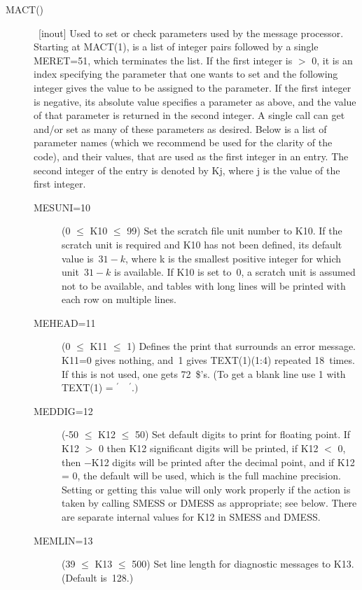 \documentclass[twoside]{MATH77}
\begin{document}
\begin{description}
\item[MACT()]  \ [inout] Used to set or check parameters used by the message
processor. Starting at MACT(1), is a list of integer pairs followed by a
single MERET=51, which terminates the list. If the first integer is $>$ 0,
it is an index specifying the parameter that one wants to set and the
following integer gives the value to be assigned to the parameter. If the
first integer is negative, its absolute value specifies a parameter as
above, and the value of that parameter is returned in the second integer. A
single call can get and/or set as many of these parameters as desired.
Below is a list of parameter names (which we recommend be used for the
clarity of the code), and their values, that are used as the first integer
in an entry. The second integer of the entry is denoted by Kj, where j is
the value of the first integer.

\begin{description}
\item[MESUNI=10]  (0 $\leq $ K10 $\leq $ 99) Set the scratch file unit
number to K10.  If the scratch unit is required and K10 has not been
defined, its default value is~$31-k$, where k is the smallest positive
integer for which unit~$31-k$ is available.  If K10 is set to~0, a
scratch unit is assumed not to be available, and tables with long
lines will be printed with each row on multiple lines.

\item[MEHEAD=11]  (0 $\leq $ K11 $\leq $ 1) Defines the print that
surrounds an error message.  K11=0 gives nothing, and~1 gives
TEXT(1)(1:4) repeated 18~times. If this is not used, one gets
72~\$'s. (To get a blank line use 1 with TEXT(1) = $^{\prime
}{\quad}^{\prime }.)$

\item[MEDDIG=12]  (-50 $\leq $ K12 $\leq $ 50) Set default digits to
print for floating point. If K12 $>$ 0 then K12 significant digits
will be printed, if K12 $<$ 0, then $-$K12 digits will be printed
after the decimal point, and if K12 = 0, the default will be used,
which is the full machine precision. Setting or getting this value
will only work properly if the action is taken by calling SMESS or
DMESS as appropriate; see below. There are separate internal values
for K12 in SMESS and DMESS.

\item[MEMLIN=13]  (39 $\leq $ K13 $\leq $ 500) Set line length for
diagnostic messages to K13.  (Default is~128.)


\end{description}
\end{description}
\end{document}
